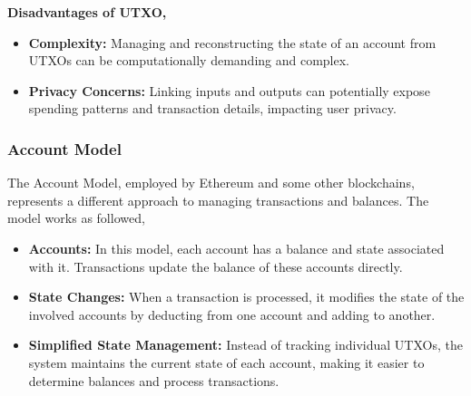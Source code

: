 \documentclass[10pt,a4paper,twocolumn]{article}
\begin{document}
\textbf{Disadvantages of UTXO,}\\ 
\begin{itemize}
\item \textbf{Complexity:} Managing and reconstructing the state of an account from UTXOs can be computationally demanding and complex.\\ 

\item \textbf{Privacy Concerns:} Linking inputs and outputs can potentially expose spending patterns and transaction details, impacting user privacy.\\
\end{itemize}

\subsubsection{Account Model}

The Account Model, employed by Ethereum and some other blockchains, represents a different approach to managing transactions and balances. The model works as followed,\\

\begin{itemize}
\item \textbf{Accounts:} In this model, each account has a balance and state associated with it. Transactions update the balance of these accounts directly.\\
    
\item \textbf{State Changes:} When a transaction is processed, it modifies the state of the involved accounts by deducting from one account and adding to another.\\
    
\item \textbf{Simplified State Management:} Instead of tracking individual UTXOs, the system maintains the current state of each account, making it easier to determine balances and process transactions.\\
\end{itemize}
\end{document}

